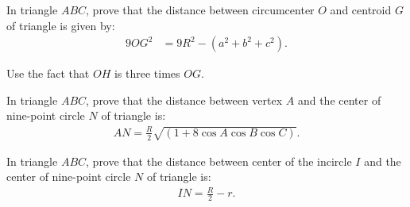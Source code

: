     \begin{question}[name=Distance Between Circumcenter and Centroid]
        In triangle $ABC$, prove that the distance between circumcenter $O$ and centroid $G$ of triangle is given by:
        \begin{align*}
            9OG^2 &= 9R^2 - (a^2+b^2+c^2).
        \end{align*}
    \end{question}

\begin{solution}
    Use the fact that $OH$ is three times $OG$.
\end{solution}

    \begin{question}[name=Distance Between Vertex and Nine-Point Center]
        In triangle $ABC$, prove that the distance between vertex $A$ and the center of nine-point circle $N$ of triangle is:
        \begin{align*}
            AN = \frac{R}{2}\sqrt{(1+8\cos A \cos B \cos C)}.
        \end{align*}
    \end{question}

    \begin{question}[name=Distance Between Incenter and Nine-Point Center]
        In triangle $ABC$, prove that the distance between center of the incircle $I$ and the center of nine-point circle $N$ of triangle is:
        \begin{align*}
            IN = \frac{R}{2}-r.
        \end{align*}
    \end{question}

